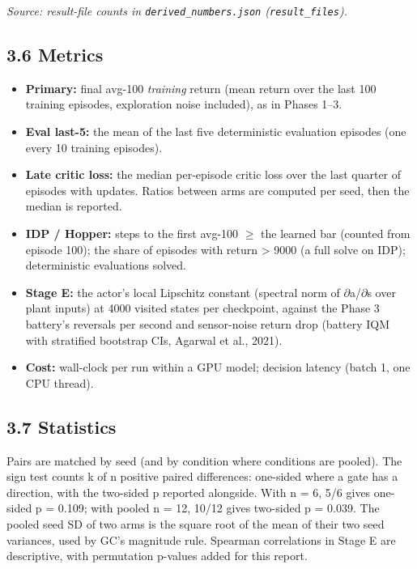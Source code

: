\documentclass[11pt]{article}
\begin{document}
\emph{Source: result-file counts in \texttt{derived\_\allowbreak{}numbers.\allowbreak{}json} (\texttt{result\_files}).}



\subsection*{3.6 Metrics}



\begin{itemize}
\item \textbf{Primary:} final avg-100 \emph{training} return (mean return over the last 100 training episodes, exploration noise included), as in Phases 1--3.
\item \textbf{Eval last-5:} the mean of the last five deterministic evaluation episodes (one every 10 training episodes).
\item \textbf{Late critic loss:} the median per-episode critic loss over the last quarter of episodes with updates. Ratios between arms are computed per seed, then the median is reported.
\item \textbf{IDP / Hopper:} steps to the first avg-100 $\geq$ the learned bar (counted from episode 100); the share of episodes with return > 9000 (a full solve on IDP); deterministic evaluations solved.
\item \textbf{Stage E:} the actor's local Lipschitz constant (spectral norm of $\partial$a/$\partial$s over plant inputs) at 4000 visited states per checkpoint, against the Phase 3 battery's reversals per second and sensor-noise return drop (battery IQM with stratified bootstrap CIs, Agarwal et al., 2021).
\item \textbf{Cost:} wall-clock per run within a GPU model; decision latency (batch 1, one CPU thread).
\end{itemize}



\subsection*{3.7 Statistics}



Pairs are matched by seed (and by condition where conditions are pooled). The sign test counts k of n positive paired differences: one-sided where a gate has a direction, with the two-sided p reported alongside. With n = 6, 5/6 gives one-sided p = 0.109; with pooled n = 12, 10/12 gives two-sided p = 0.039. The pooled seed SD of two arms is the square root of the mean of their two seed variances, used by GC's magnitude rule. Spearman correlations in Stage E are descriptive, with permutation p-values added for this report.
\end{document}
